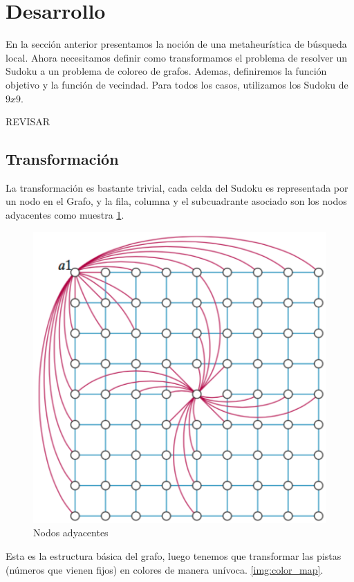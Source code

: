 \documentclass[a4paper,spanish]{article}
\begin{document}
\clearpage

\section{Desarrollo}


En la sección anterior presentamos la noción de una metaheurística de búsqueda local.
Ahora necesitamos definir como transformamos el problema de resolver un Sudoku
a un problema de coloreo de grafos.
Ademas, definiremos la función objetivo y la función de vecindad.
Para todos los casos, utilizamos los Sudoku de $ 9x9 $.

REVISAR 

\subsection{Transformación}
\label{sec:transformacion}

La transformación es bastante trivial, cada celda del Sudoku es representada por
un nodo en el Grafo, y la fila, columna y el subcuadrante asociado son los nodos
adyacentes como muestra \ref{img:adyacentes}.


\begin{figure}[h]
	\centering
	\includegraphics[scale=0.5]{./img/adyacentes.png}
    \caption{Nodos adyacentes}
    \label{img:adyacentes}
\end{figure}

Esta es la estructura básica del grafo, luego tenemos que transformar las pistas
(números que vienen fijos) en colores de manera unívoca. \ref{img:color_map}.
\end{document}
